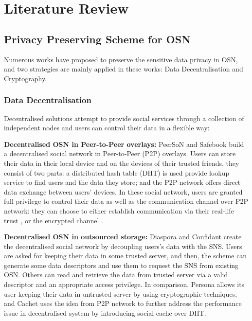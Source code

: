 \chapter{Literature Review}

\section{Privacy Preserving Scheme for OSN}
Numerous works have proposed to preserve the sensitive data privacy in OSN, and two strategies are mainly applied in these works: Data Decentralisation and Cryptography.

\subsection{Data Decentralisation}
Decentralised solutions attempt to provide social services through a collection of independent nodes and users can control their data in a flexible way:

{\bf Decentralised OSN in Peer-to-Peer overlays:} PeerSoN \cite{buchegger2009peerson} and Safebook \cite{cutillo2009safebook} build a decentralised social network in Peer-to-Peer (P2P) overlays. Users can store their data in their local device and on the devices of their trusted friends, they consist of two parts: a distributed hash table (DHT) is used provide lookup service to find users and the data they store; and the P2P network offers direct data exchange between users' devices. In these social network, users are granted full privilege to control their data as well as the communication channel over P2P network: they can choose to either establish communication via their real-life trust \cite{cutillo2009safebook}, or the encrypted channel \cite{buchegger2009peerson}.

{\bf Decentralised OSN in outsourced storage:} Diaspora \cite{diaspora2017diaspora} and Confidant \cite{liu2011confidant} create the decentralised social network by decoupling users's data with the SNS. Users are asked for keeping their data in some trusted server, and then, the scheme can generate some data descriptors and use them to request the SNS from existing OSN. Others can read and retrieve the data from trusted server via a valid descriptor and an appropriate access privilege. In comparison, Persona \cite{baden2009persona} allows its user keeping their data in untrusted server by using cryptographic techniques, and Cachet \cite{nilizadeh2012cachet} uses the idea from P2P network to further address the performance issue in decentralised system by introducing social cache over DHT.

